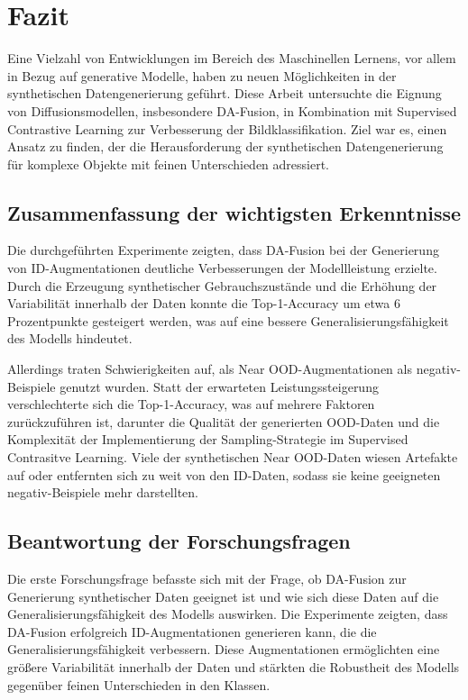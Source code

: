 \chapter{Fazit} \label{ch:conclusion}

Eine Vielzahl von Entwicklungen im Bereich des Maschinellen Lernens, vor allem in Bezug auf generative Modelle, haben zu neuen Möglichkeiten in der synthetischen Datengenerierung geführt. Diese Arbeit untersuchte die Eignung von Diffusionsmodellen, insbesondere DA-Fusion, in Kombination mit Supervised Contrastive Learning zur Verbesserung der Bildklassifikation. Ziel war es, einen Ansatz zu finden, der die Herausforderung der synthetischen Datengenerierung für komplexe Objekte mit feinen Unterschieden adressiert.

\section{Zusammenfassung der wichtigsten Erkenntnisse} \label{sec:summary}

Die durchgeführten Experimente zeigten, dass DA-Fusion bei der Generierung von ID-Augmentationen deutliche Verbesserungen der Modellleistung erzielte. Durch die Erzeugung synthetischer Gebrauchszustände und die Erhöhung der Variabilität innerhalb der Daten konnte die Top-1-Accuracy um etwa 6 Prozentpunkte gesteigert werden, was auf eine bessere Generalisierungsfähigkeit des Modells hindeutet.

Allerdings traten Schwierigkeiten auf, als Near OOD-Augmentationen als negativ-Beispiele genutzt wurden. Statt der erwarteten Leistungssteigerung verschlechterte sich die Top-1-Accuracy, was auf mehrere Faktoren zurückzuführen ist, darunter die Qualität der generierten OOD-Daten und die Komplexität der Implementierung der Sampling-Strategie im Supervised Contrasitve Learning. Viele der synthetischen Near OOD-Daten wiesen Artefakte auf oder entfernten sich zu weit von den ID-Daten, sodass sie keine geeigneten negativ-Beispiele mehr darstellten.

\section{Beantwortung der Forschungsfragen} \label{sec:research-questions-answers}

Die erste Forschungsfrage befasste sich mit der Frage, ob DA-Fusion zur Generierung synthetischer Daten geeignet ist und wie sich diese Daten auf die Generalisierungsfähigkeit des Modells auswirken. Die Experimente zeigten, dass DA-Fusion erfolgreich ID-Augmentationen generieren kann, die die Generalisierungsfähigkeit verbessern. Diese Augmentationen ermöglichten eine größere Variabilität innerhalb der Daten und stärkten die Robustheit des Modells gegenüber feinen Unterschieden in den Klassen.

